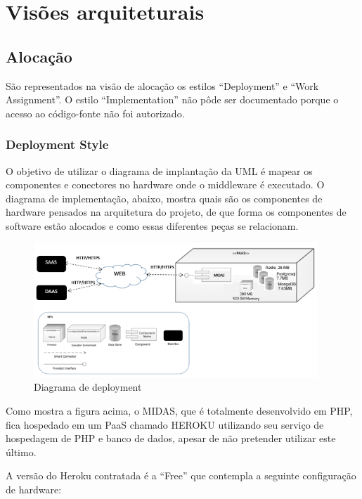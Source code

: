 \documentclass[11pt,a4paper]{article}
\begin{document}
\section{Visões arquiteturais}



\subsection{Alocação}\label{sec:aloc}

São representados na visão de alocação os estilos “Deployment” e “Work Assignment”. O estilo “Implementation” não pôde ser documentado porque o acesso ao código-fonte não foi autorizado.

\subsubsection*{Deployment Style}

O objetivo de utilizar o diagrama de implantação da UML é mapear os componentes e conectores no hardware onde o middleware é executado. O diagrama de implementação, abaixo, mostra quais são os componentes de hardware pensados na arquitetura do projeto, de que forma os componentes de software estão alocados e como essas diferentes peças se relacionam.

\begin{figure}[htb]
\centering
   \includegraphics[width=0.95\textwidth]{deployment}
\caption{Diagrama de deployment}  \label{fig:deployment}
\end{figure}

Como mostra a figura acima, o MIDAS, que é totalmente desenvolvido em PHP, fica hospedado em um PaaS chamado HEROKU utilizando seu serviço de hospedagem de PHP e banco de dados, apesar de não pretender utilizar este último.

A versão do Heroku contratada é a “Free” que contempla a seguinte configuração de hardware:
\end{document}

